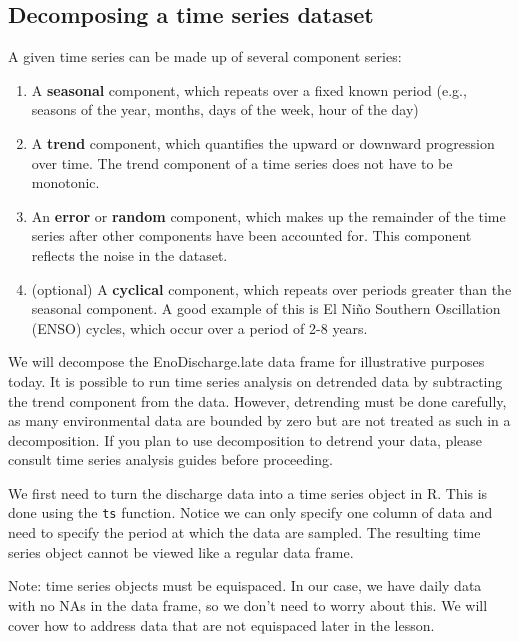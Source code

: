\documentclass[
]{article}
\providecommand{\tightlist}{%
  \setlength{\itemsep}{0pt}\setlength{\parskip}{0pt}}
\begin{document}
\hypertarget{decomposing-a-time-series-dataset}{%
\subsection{Decomposing a time series
dataset}\label{decomposing-a-time-series-dataset}}

A given time series can be made up of several component series:

\begin{enumerate}
\def\labelenumi{\arabic{enumi}.}
\tightlist
\item
  A \textbf{seasonal} component, which repeats over a fixed known period
  (e.g., seasons of the year, months, days of the week, hour of the day)
\item
  A \textbf{trend} component, which quantifies the upward or downward
  progression over time. The trend component of a time series does not
  have to be monotonic.
\item
  An \textbf{error} or \textbf{random} component, which makes up the
  remainder of the time series after other components have been
  accounted for. This component reflects the noise in the dataset.
\item
  (optional) A \textbf{cyclical} component, which repeats over periods
  greater than the seasonal component. A good example of this is El Niño
  Southern Oscillation (ENSO) cycles, which occur over a period of 2-8
  years.
\end{enumerate}

We will decompose the EnoDischarge.late data frame for illustrative
purposes today. It is possible to run time series analysis on detrended
data by subtracting the trend component from the data. However,
detrending must be done carefully, as many environmental data are
bounded by zero but are not treated as such in a decomposition. If you
plan to use decomposition to detrend your data, please consult time
series analysis guides before proceeding.

We first need to turn the discharge data into a time series object in R.
This is done using the \texttt{ts} function. Notice we can only specify
one column of data and need to specify the period at which the data are
sampled. The resulting time series object cannot be viewed like a
regular data frame.

Note: time series objects must be equispaced. In our case, we have daily
data with no NAs in the data frame, so we don't need to worry about
this. We will cover how to address data that are not equispaced later in
the lesson.
\end{document}
